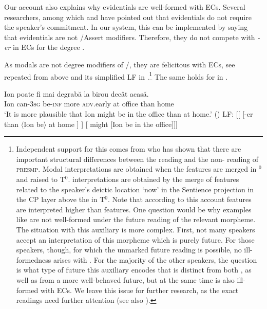 \documentclass[output=paper,colorlinks,citecolor=brown,newtxmath]{langsci/langscibook}
\begin{document}
\noindent Our account also explains why  evidentials are well-formed with ECs. Several researchers, among which \citet{fall02} and \citet{smir13} have pointed out that  evidentials do not require the speaker's commitment. In our system, this can be implemented by saying that  evidentials are not /As\-sert modifiers. Therefore, they do not compete with \textit{-er} in ECs for the degree .

 As  modals are not degree modifiers of /, they are felicitous with ECs, see  repeated from above and its simplified LF in .\footnote{Independent support for this comes from \citet{iri18} who has shown that there are important structural differences between the  reading and the non-  reading of  \textsc{presmp}. Modal interpretations are obtained when the  features are merged in $^0$ and raised to T$^0$.  interpretations are obtained by the merge of features related to the speaker's deictic location `now' in the  Sentience projection in the CP layer above the  in T$^0$. Note that according to this account  features are interpreted higher than  features. One question would be why examples like  are not well-formed under the future reading of the relevant morpheme. The situation with this auxiliary is more complex. First, not many speakers accept an interpretation of this morpheme which is purely future. For those speakers, though, for which the unmarked future reading is possible, no ill-formedness arises with . For the majority of the other speakers, the question is what type of  future this auxiliary encodes that is distinct from both , as well as from a more well-behaved future, but at the same time is also ill-formed with ECs. We leave this issue for further research, as the exact readings need further attention (see also \citealt{mih13}).
}
The same holds for  in .

 	\ea \ea \gll Ion poate fi mai degrabă la birou decât acasă.  \\
Ion 	can-\textsc{3sg} be-\textsc{inf} more \textsc{adv}.early at office than home \\
		\glt `It is more plausible that Ion might be in the office than at home.' \hfill () \label{mightroma}
   	 \ex LF: [[ { [-er than $\langle$Ion be$\rangle$ at home ] }  ] [ might [Ion be in the office]]] \label{mightromb}
     \z \z
\end{document}
